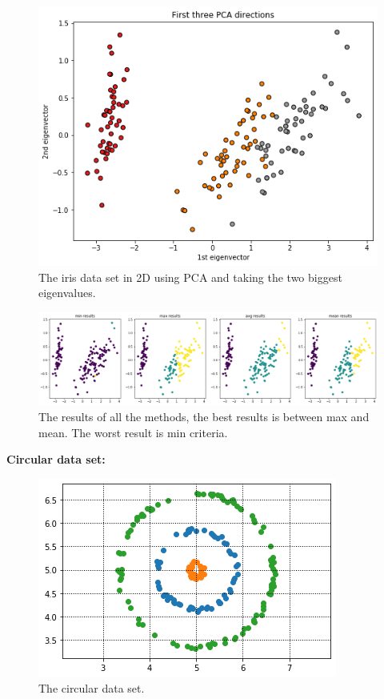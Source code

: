 \documentclass[12pt, a4paper]{paper}
\begin{document}
\begin{figure}[h!]
\centering
\includegraphics[scale=0.4]{iris_pca_hir.png}
\caption{The iris data set in 2D using PCA and taking the two biggest eigenvalues.}
\label{fig:Circular_3}
\end{figure}

\newpage

\begin{figure}[h!]
\centering
\includegraphics[scale=0.4]{iris_hir_3.png}
\caption{The results of all the methods, the best results is between max and mean. The worst result is min criteria.}
\label{fig:Circular_3}
\end{figure}

\textbf{Circular data set:}

\begin{figure}[h!]
\centering
\includegraphics[scale=0.4]{cir_hir_init.png}
\caption{The circular data set.}
\label{fig:Circular_3}
\end{figure}
\end{document}
